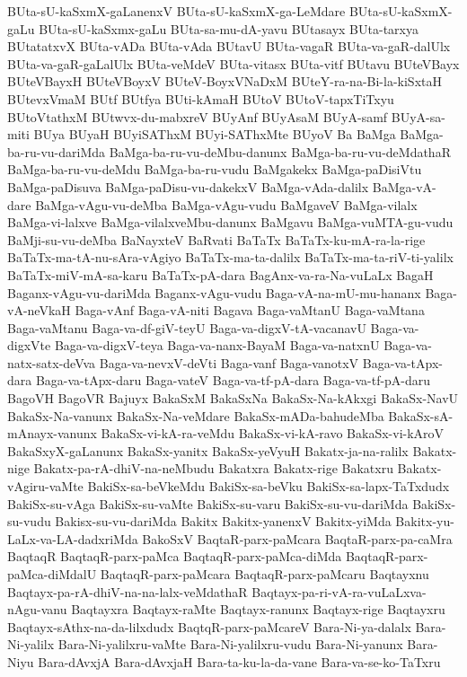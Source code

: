 {BUta-sU-kaSxmX-gaLanenxV
BUta-sU-kaSxmX-ga-LeMdare
BUta-sU-kaSxmX-gaLu
BUta-sU-kaSxmx-gaLu
BUta-sa-mu-dA-yavu
BUtasayx
BUta-tarxya
BUtatatxvX
BUta-vADa
BUta-vAda
BUtavU
BUta-vagaR
BUta-va-gaR-dalUlx
BUta-va-gaR-gaLalUlx
BUta-veMdeV
BUta-vitasx
BUta-vitf
BUtavu
BUteVBayx
BUteVBayxH
BUteVBoyxV
BUteV-BoyxVNaDxM
BUteY-ra-na-Bi-la-kiSxtaH
BUtevxVmaM
BUtf
BUtfya
BUti-kAmaH
BUtoV
BUtoV-tapxTiTxyu
BUtoVtathxM
BUtwvx-du-mabxreV
BUyAnf
BUyAsaM
BUyA-samf
BUyA-sa-miti
BUya
BUyaH
BUyiSAThxM
BUyi-SAThxMte
BUyoV
Ba
BaMga
BaMga-ba-ru-vu-dariMda
BaMga-ba-ru-vu-deMbu-danunx
BaMga-ba-ru-vu-deMdathaR
BaMga-ba-ru-vu-deMdu
BaMga-ba-ru-vudu
BaMgakekx
BaMga-paDisiVtu
BaMga-paDisuva
BaMga-paDisu-vu-dakekxV
BaMga-vAda-dalilx
BaMga-vA-dare
BaMga-vAgu-vu-deMba
BaMga-vAgu-vudu
BaMgaveV
BaMga-vilalx
BaMga-vi-lalxve
BaMga-vilalxveMbu-danunx
BaMgavu
BaMga-vuMTA-gu-vudu
BaMji-su-vu-deMba
BaNayxteV
BaRvati
BaTaTx
BaTaTx-ku-mA-ra-la-rige
BaTaTx-ma-tA-nu-sAra-vAgiyo
BaTaTx-ma-ta-dalilx
BaTaTx-ma-ta-riV-ti-yalilx
BaTaTx-miV-mA-sa-karu
BaTaTx-pA-dara
BagAnx-va-ra-Na-vuLaLx
BagaH
Baganx-vAgu-vu-dariMda
Baganx-vAgu-vudu
Baga-vA-na-mU-mu-hananx
Baga-vA-neVkaH
Baga-vAnf
Baga-vA-niti
Bagava
Baga-vaMtanU
Baga-vaMtana
Baga-vaMtanu
Baga-va-df-giV-teyU
Baga-va-digxV-tA-vacanavU
Baga-va-digxVte
Baga-va-digxV-teya
Baga-va-nanx-BayaM
Baga-va-natxnU
Baga-va-natx-satx-deVva
Baga-va-nevxV-deVti
Baga-vanf
Baga-vanotxV
Baga-va-tApx-dara
Baga-va-tApx-daru
Baga-vateV
Baga-va-tf-pA-dara
Baga-va-tf-pA-daru
BagoVH
BagoVR
Bajuyx
BakaSxM
BakaSxNa
BakaSx-Na-kAkxgi
BakaSx-NavU
BakaSx-Na-vanunx
BakaSx-Na-veMdare
BakaSx-mADa-bahudeMba
BakaSx-sA-mAnayx-vanunx
BakaSx-vi-kA-ra-veMdu
BakaSx-vi-kA-ravo
BakaSx-vi-kAroV
BakaSxyX-gaLanunx
BakaSx-yanitx
BakaSx-yeVyuH
Bakatx-ja-na-ralilx
Bakatx-nige
Bakatx-pa-rA-dhiV-na-neMbudu
Bakatxra
Bakatx-rige
Bakatxru
Bakatx-vAgiru-vaMte
BakiSx-sa-beVkeMdu
BakiSx-sa-beVku
BakiSx-sa-lapx-TaTxdudx
BakiSx-su-vAga
BakiSx-su-vaMte
BakiSx-su-varu
BakiSx-su-vu-dariMda
BakiSx-su-vudu
Bakisx-su-vu-dariMda
Bakitx
Bakitx-yanenxV
Bakitx-yiMda
Bakitx-yu-LaLx-va-LA-dadxriMda
BakoSxV
BaqtaR-parx-paMcara
BaqtaR-parx-pa-caMra
BaqtaqR
BaqtaqR-parx-paMca
BaqtaqR-parx-paMca-diMda
BaqtaqR-parx-paMca-diMdalU
BaqtaqR-parx-paMcara
BaqtaqR-parx-paMcaru
Baqtayxnu
Baqtayx-pa-rA-dhiV-na-na-lalx-veMdathaR
Baqtayx-pa-ri-vA-ra-vuLaLxva-nAgu-vanu
Baqtayxra
Baqtayx-raMte
Baqtayx-ranunx
Baqtayx-rige
Baqtayxru
Baqtayx-sAthx-na-da-lilxdudx
BaqtqR-parx-paMcareV
Bara-Ni-ya-dalalx
Bara-Ni-yalilx
Bara-Ni-yalilxru-vaMte
Bara-Ni-yalilxru-vudu
Bara-Ni-yanunx
Bara-Niyu
Bara-dAvxjA
Bara-dAvxjaH
Bara-ta-ku-la-da-vane
Bara-va-se-ko-TaTxru
}
